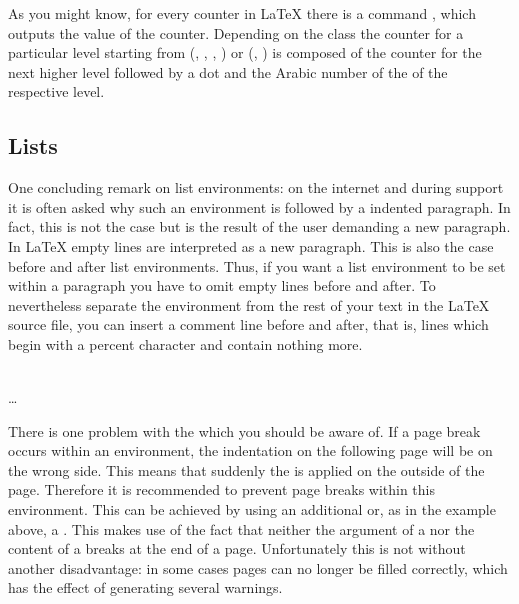 \begin{Declaration}
\end{Declaration}%
%
As you might know, for every counter in {\LaTeX} there is a command
, which outputs the value of the
counter. Depending on the class the counter for a particular level
starting from  (, ,
, ) or 
(, ) is composed of the counter for the
next higher level followed by a dot and the Arabic number of the
 of the respective level.\par
%
%

\subsection{Lists}
\label{sec:maincls-experts.lists} 

One concluding remark on list environments: on the internet and during support
it is often asked why such an environment is followed by a
indented paragraph. In fact, this is not the case but is
the result of the user demanding a new paragraph. In {\LaTeX} empty lines are
interpreted as a new paragraph. This is also the case before and after list
environments. Thus, if you want a list environment to be set within a
paragraph you have to omit empty lines before and after. To nevertheless
separate the environment from the rest of your text in the {\LaTeX} source
file, you can insert a comment line before and after, that is, lines which
begin with a percent character and contain nothing more.

\begin{Declaration}
  \\
  \quad\dots\\
\end{Declaration}
%
There is one problem with the  which you
should be aware of. If a page break occurs within an
 environment, the indentation on the following
page will be on the wrong side.  This means that suddenly the
 is applied on the outside of the
page. Therefore it is recommended to prevent page breaks within this
environment. This can be achieved by using an additional
 or, as in the example above, a
. This makes use of the fact that neither the
argument of a  nor the content of a
 breaks at the end of a page.  Unfortunately
this is not without another disadvantage: in some cases pages can no
longer be filled correctly, which has the effect of generating several
warnings.
%

